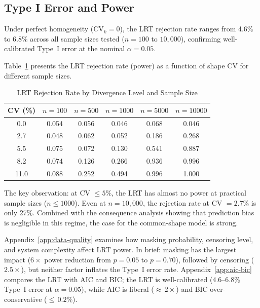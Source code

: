 \documentclass[11pt]{article}
\begin{document}
\subsection{Type I Error and Power}

Under perfect homogeneity ($\text{CV}_k = 0$), the LRT rejection rate ranges from 4.6\% to 6.8\% across all sample sizes tested ($n = 100$ to $10{,}000$), confirming well-calibrated Type~I error at the nominal $\alpha = 0.05$.

Table~\ref{tab:power-by-cv} presents the LRT rejection rate (power) as a function of shape CV for different sample sizes.

\begin{table}[htbp]
\centering
\caption{LRT Rejection Rate by Divergence Level and Sample Size}
\label{tab:power-by-cv}
\small
\begin{tabular}{cccccc}
\hline
CV (\%) & $n = 100$ & $n = 500$ & $n = 1000$ & $n = 5000$ & $n = 10000$ \\
\hline
0.0 & 0.054 & 0.056 & 0.046 & 0.068 & 0.046 \\
2.7 & 0.048 & 0.062 & 0.052 & 0.186 & 0.268 \\
5.5 & 0.075 & 0.072 & 0.130 & 0.541 & 0.887 \\
8.2 & 0.074 & 0.126 & 0.266 & 0.936 & 0.996 \\
11.0 & 0.088 & 0.252 & 0.494 & 0.996 & 1.000 \\
\hline
\end{tabular}
\end{table}

The key observation: at CV $\leq 5\%$, the LRT has almost no power at practical sample sizes ($n \leq 1000$). Even at $n = 10{,}000$, the rejection rate at CV $= 2.7\%$ is only 27\%. Combined with the consequence analysis showing that prediction bias is negligible in this regime, the case for the common-shape model is strong.

Appendix~\ref{app:data-quality} examines how masking probability, censoring level, and system complexity affect LRT power. In brief: masking has the largest impact ($6\times$ power reduction from $p = 0.05$ to $p = 0.70$), followed by censoring ($2.5\times$), but neither factor inflates the Type~I error rate. Appendix~\ref{app:aic-bic} compares the LRT with AIC and BIC; the LRT is well-calibrated (4.6--6.8\% Type~I error at $\alpha = 0.05$), while AIC is liberal (${\approx}\,2\times$) and BIC over-conservative (${\leq}\,0.2\%$).

\end{document}

